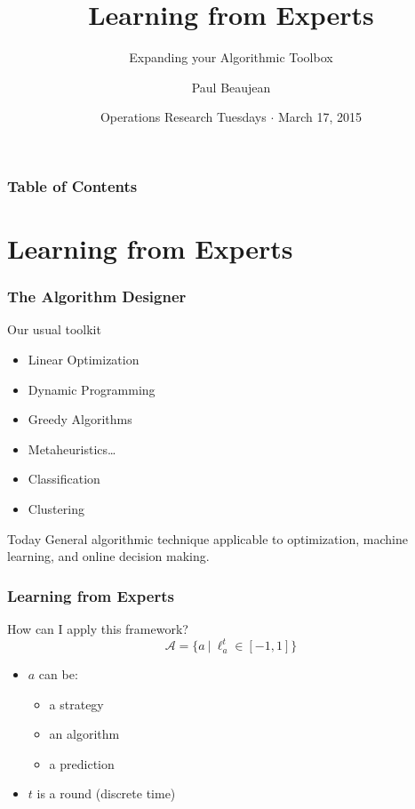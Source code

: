 \documentclass{beamer}
\title{Learning from Experts}
\subtitle{Expanding your Algorithmic Toolbox}
\date{Operations Research Tuesdays $\cdot$ March 17, 2015}
\author{Paul Beaujean\inst{\dag}}
\institute{\inst{\dag}IMT/OLN/NMP/TRM}
\begin{document}
\frame{\titlepage}

\begin{frame}
    \frametitle{Table of Contents}
    \tableofcontents{}
\end{frame}

\section{Learning from Experts}
\begin{frame}
    \frametitle{The Algorithm Designer}

    \begin{block}{Our usual toolkit}
        \begin{itemize}
            \item Linear Optimization
            \item Dynamic Programming
            \item Greedy Algorithms
            \item Metaheuristics\ldots
            \item Classification
            \item Clustering
        \end{itemize}
    \end{block}

    \begin{block}{Today}
        General algorithmic technique applicable to optimization, machine
        learning, and online decision making.
    \end{block}

\end{frame}

\begin{frame}
    \frametitle{Learning from Experts}

    \begin{block}{How can I apply this framework?}
        \begin{equation*}
            \mathcal{A} = \{ a~|~\ell_a^t \in [-1, 1]  \}
        \end{equation*}

        \begin{itemize}
            \item $a$ can be:
        \begin{itemize}
            \item a strategy
            \item an algorithm
            \item a prediction
        \end{itemize}
            \item $t$ is a round (discrete time)
        \end{itemize}
    \end{block}

\end{frame}
\end{document}
